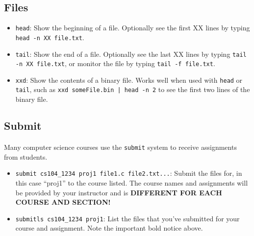 \documentclass[letter,11pt]{article}
\begin{document}
\FloatBarrier
\subsection{Files}
\begin{itemize}
    \item \texttt{head}: Show the beginning of a file. Optionally see the first XX lines by typing \texttt{head -n XX file.txt}.
    \item \texttt{tail}: Show the end of a file. Optionally see the last XX lines by typing \texttt{tail -n XX file.txt}, or monitor the file by typing \texttt{tail -f file.txt}.
    \item \texttt{xxd}: Show the contents of a binary file. Works well when used with \texttt{head} or \texttt{tail}, such as \texttt{xxd someFile.bin | head -n 2} to see the first two lines of the binary file.
\end{itemize}

\FloatBarrier
\subsection{Submit}
\paragraph{}Many computer science courses use the \texttt{submit} system to receive assignments from students.
\begin{itemize}
    \item \texttt{submit cs104\_1234 proj1 file1.c file2.txt...}: Submit the files for, in this case ``proj1'' to the course listed. The course names and assignments will be provided by your instructor and is \textbf{DIFFERENT FOR EACH COURSE AND SECTION!}
    \item \texttt{submitls cs104\_1234 proj1}: List the files that you've submitted for your course and assignment. Note the important bold notice above.
\end{itemize}

\FloatBarrier
\end{document}
